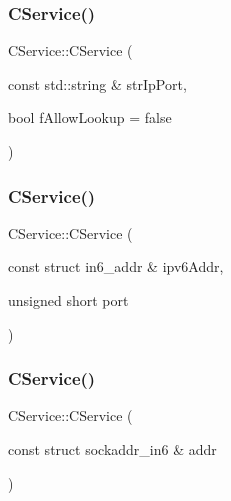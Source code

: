 \mbox{\label{class_c_service_a19a7a713dd9a30b2f78260e61d9a2604}} 
\subsubsection{\texorpdfstring{C\+Service()}{CService()}\hspace{0.1cm}{\footnotesize\ttfamily [8/10]}}
{\footnotesize\ttfamily C\+Service\+::\+C\+Service (\begin{DoxyParamCaption}\item[{const std\+::string \&}]{str\+Ip\+Port,  }\item[{bool}]{f\+Allow\+Lookup = {\ttfamily false} }\end{DoxyParamCaption})\hspace{0.3cm}{\ttfamily [explicit]}}

\mbox{\label{class_c_service_a92fd246e176f01266cb36beae0c8f4fe}} 
\subsubsection{\texorpdfstring{C\+Service()}{CService()}\hspace{0.1cm}{\footnotesize\ttfamily [9/10]}}
{\footnotesize\ttfamily C\+Service\+::\+C\+Service (\begin{DoxyParamCaption}\item[{const struct in6\+\_\+addr \&}]{ipv6\+Addr,  }\item[{unsigned short}]{port }\end{DoxyParamCaption})}

\mbox{\label{class_c_service_ac0eb3107507be78cc683e7a7fa8d56e4}} 
\subsubsection{\texorpdfstring{C\+Service()}{CService()}\hspace{0.1cm}{\footnotesize\ttfamily [10/10]}}
{\footnotesize\ttfamily C\+Service\+::\+C\+Service (\begin{DoxyParamCaption}\item[{const struct sockaddr\+\_\+in6 \&}]{addr }\end{DoxyParamCaption})}



